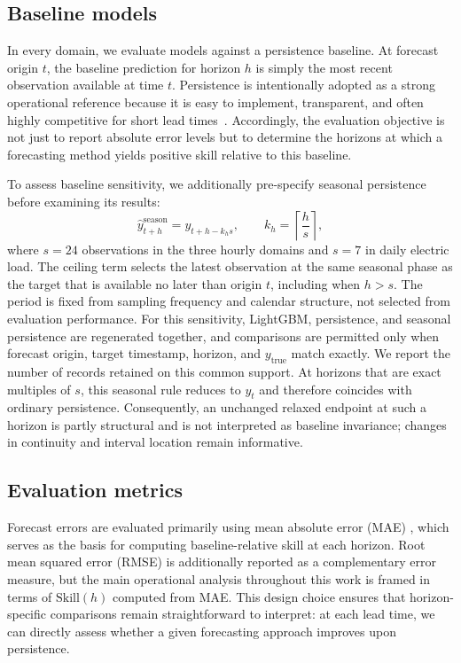 \documentclass[pdflatex]{sn-jnl}
\begin{document}
\subsection{Baseline models}

In every domain, we evaluate models against a persistence baseline. At forecast origin $t$, the baseline prediction for horizon $h$ is simply the most recent observation available at time $t$. Persistence is intentionally adopted as a strong operational reference because it is easy to implement, transparent, and often highly competitive for short lead times~\citep{murphy1993,hyndman2018}. Accordingly, the evaluation objective is not just to report absolute error levels but to determine the horizons at which a forecasting method yields positive skill relative to this baseline.

To assess baseline sensitivity, we additionally pre-specify seasonal
persistence before examining its results:
\begin{equation}
  \hat y^{\mathrm{season}}_{t+h}=y_{t+h-k_hs},
  \qquad k_h=\left\lceil\frac{h}{s}\right\rceil,
\end{equation}
where $s=24$ observations in the three hourly domains and $s=7$ in daily
electric load. The ceiling term selects the latest observation at the same
seasonal phase as the target that is available no later than origin $t$,
including when $h>s$. The period is fixed from sampling frequency and calendar
structure, not selected from evaluation performance. For this sensitivity,
LightGBM, persistence, and seasonal persistence are regenerated together, and
comparisons are permitted only when forecast origin, target timestamp, horizon,
and $y_{\mathrm{true}}$ match exactly. We report the number of records retained
on this common support.
At horizons that are exact multiples of $s$, this seasonal rule reduces to
$y_t$ and therefore coincides with ordinary persistence. Consequently, an
unchanged relaxed endpoint at such a horizon is partly structural and is not
interpreted as baseline invariance; changes in continuity and interval location
remain informative.

\subsection{Evaluation metrics}

Forecast errors are evaluated primarily using mean absolute error (MAE) \citep{hyndman2006}, which serves as the basis for computing baseline-relative skill at each horizon. Root mean squared error (RMSE) is additionally reported as a complementary error measure, but the main operational analysis throughout this work is framed in terms of $\mathrm{Skill}(h)$ computed from MAE. This design choice ensures that horizon-specific comparisons remain straightforward to interpret: at each lead time, we can directly assess whether a given forecasting approach improves upon persistence.
\end{document}
